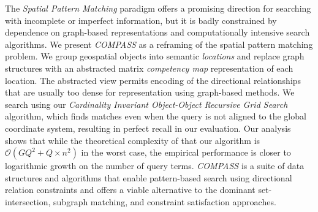 
The \textit{Spatial Pattern Matching} paradigm offers a promising direction for searching with incomplete or imperfect information, but it is badly constrained by dependence on graph-based representations and computationally intensive search algorithms. 
We present \emph{COMPASS} as a reframing of the spatial pattern matching problem. 
We group geospatial objects into semantic \textit{locations} and replace graph structures with an abstracted matrix \textit{competency map} representation of each location. 
The abstracted view permits encoding of the directional relationships that are usually too dense for representation using graph-based methods. We search using our \textit{Cardinality Invariant Object-Object Recursive 
Grid Search} algorithm, which finds matches even when the query is not aligned to the global coordinate system, resulting in perfect recall in our evaluation. 
Our analysis shows that while the theoretical complexity of that our algorithm is $\mathcal{O}(GQ^2 + Q\times n^2)$ 
in the worst case, the empirical performance is closer to logarithmic growth on the number of query terms.
\emph{COMPASS} is a suite of data structures and algorithms that enable pattern-based search using directional relation constraints and offers a viable alternative to the dominant set-intersection, subgraph matching, and constraint satisfaction approaches.



